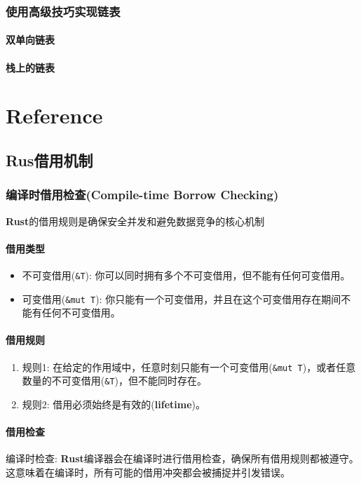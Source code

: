 \documentclass[oneside]{book}
\begin{document}
\section{使用高级技巧实现链表}{
    \subsection{双单向链表}{

    }

    \subsection{栈上的链表}{

    }
}

\part{Reference}

\chapter{Rus借用机制}

\section{编译时借用检查(Compile-time Borrow Checking)}{
    \textbf{Rust}的借用规则是确保安全并发和避免数据竞争的核心机制

    \subsection{借用类型}{
        \begin{itemize}
            \item 不可变借用(\texttt{\&T}): 你可以同时拥有多个不可变借用，但不能有任何可变借用。
            \item 可变借用(\texttt{\&mut T}): 你只能有一个可变借用，并且在这个可变借用存在期间不能有任何不可变借用。
        \end{itemize}
    }

    \subsection{借用规则}{
        \begin{enumerate}
            \item 规则1: 在给定的作用域中，任意时刻只能有一个可变借用(\texttt{\&mut T})，或者任意数量的不可变借用(\texttt{\&T})，但不能同时存在。
            \item 规则2: 借用必须始终是有效的(\textbf{lifetime})。
        \end{enumerate}
    }

    \subsection{借用检查}{
        编译时检查: \textbf{Rust}编译器会在编译时进行借用检查，确保所有借用规则都被遵守。这意味着在编译时，所有可能的借用冲突都会被捕捉并引发错误。
    }
}
\end{document}
